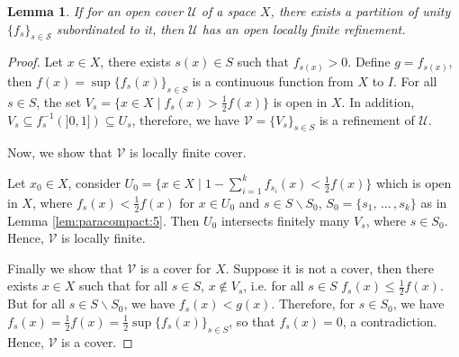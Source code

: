 \documentclass[12pt,oneside,english]{amsbook}
\numberwithin{equation}{section} %
\numberwithin{figure}{section} %
\theoremstyle{plain}
\numberwithin{section}{chapter}
\theoremstyle{plain}
\newtheorem{lem}[thm]{Lemma}
\begin{document}
\begin{lem} \label{lem:paracompact:6}
  If for an open cover $\mathcal{U}$ of a space $X$, there exists a partition of unity $\{f_{s}\}_{s \in \mathcal{S}}$ subordinated to it, then $\mathcal{U}$ has an open locally finite refinement.
\end{lem}
\begin{proof}
  Let $x \in X$, there exists $s(x) \in S$ such that $f_{s(x)} > 0$. Define $g = f_{s(x)}$, then $f(x) = \sup{\{f_{s}(x)\}_{s \in S}}$ is a continuous function from $X$ to $I$. For all $s \in S$, the set $V_{s} = \{x \in X \; | \; f_{s}(x) > \frac{1}{2}f(x)\}$ is open in $X$. In addition, $V_{s} \subseteq f_{s}^{-1}(]0,1]) \subseteq U_{s}$, therefore, we have $\mathcal{V} = \{V_{s}\}_{s \in S}$ is a refinement of $\mathcal{U}$.

  Now, we show that $\mathcal{V}$ is locally finite cover.

  Let $x_{0} \in X$, consider $U_{0} = \{x \in X \; | \; 1 - \sum_{i = 1}^{k}f_{s_{i}}(x) < \frac{1}{2}f(x) \}$ which is open in $X$, where $f_{s}(x) < \frac{1}{2}f(x)$ for $x \in U_{0}$ and $s \in S \backslash S_{0}$, $S_{0} = \{s_{1}, \, \ldots \, ,s_{k}\}$ as in Lemma \ref{lem:paracompact:5}. Then $U_{0}$ intersects finitely many $V_{s}$, where $s \in S_{0}$. Hence, $\mathcal{V}$ is locally finite.
  
  Finally we show that $\mathcal{V}$ is a cover for $X$. Suppose it is not a cover, then there exists $x \in X$ such that for all  $s \in S$, $x \notin V_{s}$, i.e. for all $s \in S$ $f_{s}(x) \leq \frac{1}{2}f(x)$. But for all $s \in S \backslash S_{0}$, we have $f_{s}(x) < g(x)$. Therefore, for $s \in S_{0}$, we have $f_{s}(x) = \frac{1}{2}f(x) = \frac{1}{2} \sup{\{f_{s}(x)\}_{s \in S}}$, so that $f_{s}(x) = 0$, a contradiction. Hence, $\mathcal{V}$ is a cover.
\end{proof}
\end{document}
